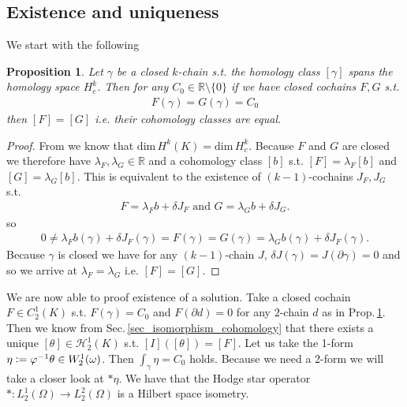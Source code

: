 \documentclass[12pt,a4paper]{article}
\newtheorem{proposition}{Proposition}
\theoremstyle{definition}
\newcommand{\real}{\mathbb{R}}
\begin{document}
\subsection{Existence and uniqueness}

We start with the following
\begin{proposition}\label{uniqueness_cochain}
    Let $\gamma$ be a closed $k$-chain s.t. the homology class $[\gamma]$ 
    spans the homology space $H^k_c$. Then for any $C_0 \in \real 
    \setminus \{0\}$ 
    if we have closed cochains $F,G$ s.t.
    \begin{align*}
    F(\gamma) = G(\gamma)= C_0
    \end{align*}
    then $[F] = [G]$ i.e. their cohomology classes are equal.
\end{proposition} 
\begin{proof}
    From \cite[Sec. 2.5]{arnold} we know that 
    $\text{dim}\,H^k(K) = \text{dim}\,H^k_c$. Because $F$ and $G$ are closed we
    therefore have $\lambda_F, \lambda_G \in \real$ and a cohomology class 
    $[b]$ s.t.
    $[F] = \lambda_F [b]$ and $[G] = \lambda_G [b]$. This is 
    equivalent to the existence of $(k-1)$-cochains $J_F,J_G$ s.t. 
    \begin{align*}
        F = \lambda_F b + \delta J_F \text{ and } G = \lambda_G b + \delta J_G.
    \end{align*}
    so 
    \begin{align*}
        0 \neq \lambda_F b(\gamma) + \delta J_F(\gamma) = F(\gamma) = G(\gamma)
        = \lambda_G b(\gamma) + \delta J_F(\gamma).
    \end{align*}
    Because $\gamma$ is closed we have for any $(k-1)$-chain $J$, 
    $\delta J(\gamma) = J(\partial \gamma) = 0$ and so we arrive at
    $\lambda_F = \lambda_G$ i.e. $[F] = [G]$.
\end{proof}





We are now able to proof existence of a 
solution. Take a closed cochain $F \in C^1_2(K)$ s.t. $F(\gamma) = C_0$ 
and 
$F(\partial d) = 0$ for any $2$-chain $d$ 
as in Prop.\,\ref{uniqueness_cochain}. Then we know from 
Sec.\,\ref{sec_isomorphism_cohomology} that 
there exists a unique $[\theta] \in \mathscr{H}_2^1(K)$ s.t. 
$[I]([\theta]) = [F]$. Let us take the 1-form $\eta \vcentcolon= 
\varphi^{-1} \theta \in W^1_2(\omega)$. Then $\int_\gamma \eta = C_0$ holds. 
Because we need a 2-form we will take a closer look at $*\eta$.
We have that the Hodge star operator $*: L^1_2(\Omega) \rightarrow 
L^2_2(\Omega)$ is a Hilbert space isometry. 
\end{document}
